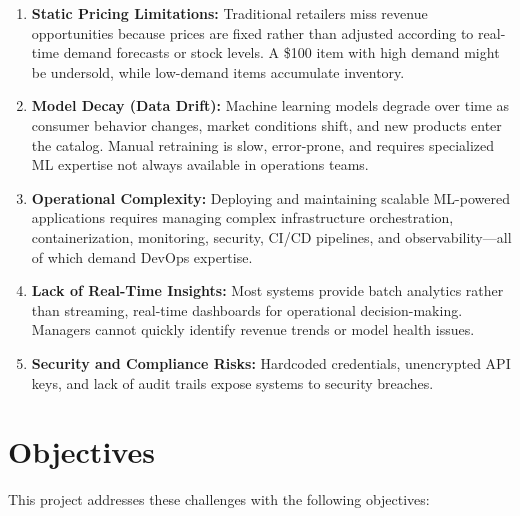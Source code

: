 \documentclass[12pt,a4paper]{report}
\begin{document}
\begin{enumerate}[leftmargin=2em]
    \item \textbf{Static Pricing Limitations:} Traditional retailers miss revenue opportunities because prices are fixed rather than adjusted according to real-time demand forecasts or stock levels. A \$100 item with high demand might be undersold, while low-demand items accumulate inventory.

    \item \textbf{Model Decay (Data Drift):} Machine learning models degrade over time as consumer behavior changes, market conditions shift, and new products enter the catalog. Manual retraining is slow, error-prone, and requires specialized ML expertise not always available in operations teams.

    \item \textbf{Operational Complexity:} Deploying and maintaining scalable ML-powered applications requires managing complex infrastructure orchestration, containerization, monitoring, security, CI/CD pipelines, and observability---all of which demand DevOps expertise.

    \item \textbf{Lack of Real-Time Insights:} Most systems provide batch analytics rather than streaming, real-time dashboards for operational decision-making. Managers cannot quickly identify revenue trends or model health issues.

    \item \textbf{Security and Compliance Risks:} Hardcoded credentials, unencrypted API keys, and lack of audit trails expose systems to security breaches.
\end{enumerate}

\section{Objectives}

This project addresses these challenges with the following objectives:
\end{document}
